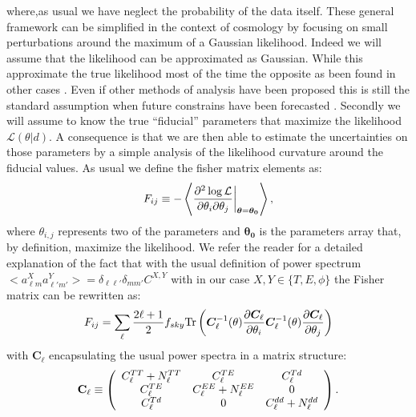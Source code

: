 \documentclass[aps,prd,preprint,groupedaddress]{revtex4-1}
\begin{document}
where,as usual we have neglect the probability of the data itself.
These general framework can be simplified in the context of cosmology by focusing on small perturbations around the maximum of a Gaussian likelihood. 
Indeed we will assume that the likelihood can be approximated as Gaussian.
While this approximate the true likelihood most of the time the opposite as been found in other cases \cite{2012JCAP...09..009W}. Even if other methods of analysis have been proposed \cite{2006JCAP...10..013P,2006astro.ph..9591A} this is still the standard assumption when future constrains have been forecasted \cite{wu:2014}.
Secondly we will assume to know the true ``fiducial'' parameters that maximize the likelihood $\mathcal{L}(\theta|d)$. A consequence is that we are then able to estimate the uncertainties on those parameters by a simple analysis of the likelihood curvature around the fiducial values.
As usual we define the fisher matrix elements as:
\begin{equation}
	\centering
		F_{ij} \equiv - \left\langle\frac{\partial^2 \log \mathcal{L}}{\partial \theta_i \partial \theta_j} \bigg|_{\boldsymbol{\theta} = \boldsymbol{\theta_0}}\right\rangle,
	\label{eq:Fij_def}
\end{equation}
where $\theta_{i,j}$ represents two of the parameters and $\boldsymbol{\theta_0}$ is the parameters array that, by definition, maximize the likelihood.
We refer the reader for a detailed explanation of the fact that with the usual definition of power spectrum $<a_{\ell m}^{X}a_{\ell' m'}^{Y}>=\delta_{\ell \ell'}\delta_{mm'}C^{X,Y}$ with in our case $X,Y\in\{T,E,\phi\}$ the Fisher matrix can be rewritten as:
\begin{equation}
 F_{ij} = \sum_\ell \frac{2\ell+1}{2} f_{sky} {\rm Tr} \left(  \boldsymbol{C}^{-1}_\ell( \theta) \frac{\partial \boldsymbol{C}_\ell}{\partial \theta_i} \boldsymbol{C}^{-1}_\ell( \theta) \frac{\partial \boldsymbol{C}_\ell}{\partial \theta_j}  \right)
 \end{equation}
 with $\boldsymbol{C}_\ell$ encapsulating the usual power spectra in a matrix structure:
 \begin{eqnarray}
 	\centering
		\mathbf{C}_\ell \equiv \left( \begin{array}{ccc}C_\ell^{TT} + N_\ell^{TT} & C_\ell^{TE} & C_\ell^{Td} \\ C_\ell^{TE} & C_\ell^{EE} + N_\ell^{EE} & 0 \\ C_\ell^{Td} & 0 & C_\ell^{dd} + N_\ell^{dd}\end{array}\right).
	\label{eq:cov_definition}
\end{eqnarray}
\end{document}

